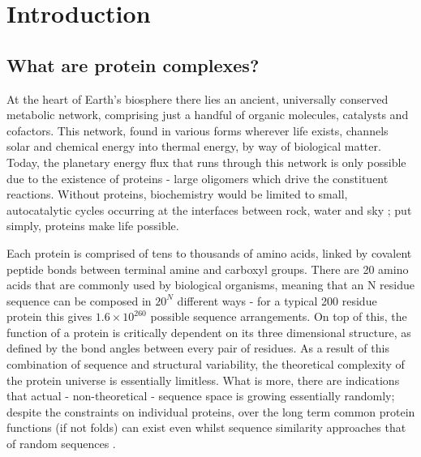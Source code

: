 \documentclass[a4paper,11pt,twoside,openright]{scrbook}
\begin{document}
\chapter{Introduction} \label{chapter:intro}

\section{What are protein complexes?}
At the heart of Earth's biosphere there lies an ancient, universally conserved metabolic network, comprising just a handful of organic molecules, catalysts and cofactors. This network, found in various forms wherever life exists, channels solar and chemical energy into thermal energy, by way of biological matter. Today, the planetary energy flux that runs through this network is only possible due to the existence of proteins - large oligomers which drive the constituent reactions. Without proteins, biochemistry would be limited to small, autocatalytic cycles occurring at the interfaces between rock, water and sky \cite{Smith2016}; put simply, proteins make life possible.

Each protein is comprised of tens to thousands of amino acids, linked by covalent peptide bonds between terminal amine and carboxyl groups. There are 20 amino acids that are commonly used by biological organisms, meaning that an N residue sequence can be composed in \(20^{N}\) different ways - for a typical 200 residue protein this gives \(1.6 \times 10^{260}\) possible sequence arrangements. On top of this, the function of a protein is critically dependent on its three dimensional structure, as defined by the bond angles between every pair of residues. As a result of this combination of sequence and structural variability, the theoretical complexity of the protein universe is essentially limitless. What is more, there are indications that actual - non-theoretical - sequence space is growing essentially randomly; despite the constraints on individual proteins, over the long term common protein functions (if not folds) can exist even whilst sequence similarity approaches that of random sequences \cite{Larson2002,Povolotskaya2010}.

\end{document}
